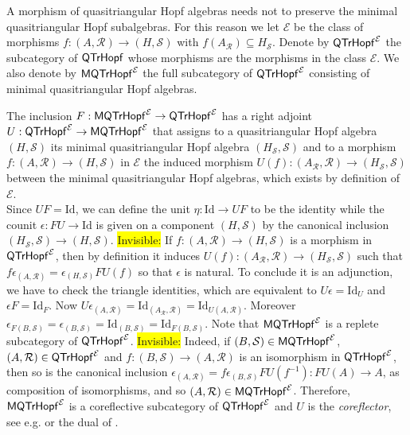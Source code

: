 \documentclass[nosumlimits,twoside]{amsart}
\theoremstyle{definition}
\newtheorem{definition}[definition]{\sc Definition}
\theoremstyle{remark}
\newenvironment{invisible}{{\noindent\sc \colorbox{yellow}{Invisible:}\;}\color{gray}}{\medskip}
\newcommand{\rd}[1]{{\color{red}{#1}}}
\newcommand{\id}{\mathrm{Id}}
\newcommand{\Rr}{\mathcal{R}}
\newcommand{\Ss}{\mathcal{S}}
\def\QTrHopf{{\sf QTrHopf}}
\def\MQTrHopf{{\sf MQTrHopf}}
\begin{document}


A morphism of quasitriangular Hopf algebras needs not to preserve the minimal quasitriangular Hopf subalgebras. For this reason we let $\mathcal{E}$ be the class of morphisms $f:(A,\Rr)\to (H,\Ss)$ with $f(A_\Rr)\subseteq H_{\Ss}$.
Denote by $\QTrHopf^\mathcal{E}
$ the subcategory of $\QTrHopf$ whose morphisms are the morphisms in the class $\mathcal{E}$.
We also denote by $\MQTrHopf^\mathcal{E}$ the full subcategory of $\QTrHopf^\mathcal{E}$ consisting of minimal quasitriangular Hopf algebras.

The inclusion $F:\MQTrHopf^\mathcal{E}\to \QTrHopf^\mathcal{E}$ has a right adjoint
$U:\QTrHopf^\mathcal{E}\to \MQTrHopf^\mathcal{E}$ that assigns to a quasitriangular Hopf algebra $(H,\Ss)$ its minimal quasitriangular Hopf algebra $(H_{\Ss},\Ss)$ and to a morphism $f:(A,\Rr)\to (H,\Ss)$ in $\mathcal{E}$ the induced morphism $U(f):(A_{\Rr},\Rr)\to (H_\Ss,\Ss)$ between the minimal quasitriangular Hopf algebras, which exists by definition of $\mathcal{E}$. \\
Since $UF=\id$, we can define the unit $\eta:\id\to UF$ to be the identity while the counit $\epsilon:FU\to \id$ is given on a component $(H,\Ss)$ by the canonical inclusion $(H_\Ss,\Ss)\to (H,\Ss)$.
\begin{invisible}
If $f:(A,\Rr)\to (H,\Ss)$ is a morphism in $\QTrHopf^\mathcal{E}$, then by definition it induces $U(f):(A_\Rr,\Rr)\to (H_\Ss,\Ss)$ such that $f\epsilon_{(A,\Rr)}=\epsilon_{(H,\Ss)}FU(f)$ so that $\epsilon$ is natural. To conclude it is an adjunction, we have to check the triangle identities, which are equivalent to $U\epsilon=\id_U$ and $\epsilon F=\id_F$. Now $U\epsilon_{(A,\Rr)}=\id_{(A_\Rr,\Rr)}=\id_{U(A,\Rr)}$. Moreover $\epsilon _{F(B,\Ss)}=\epsilon _{(B,\Ss)}=\id_{(B,\Ss)}=\id _{F(B,\Ss)}$.
\end{invisible}
Note that $\MQTrHopf^\mathcal{E}$ is  a replete subcategory of $\QTrHopf^\mathcal{E}$.
\begin{invisible}
Indeed, if $(B,\Ss)\in\MQTrHopf^\mathcal{E}$,  $(A,\Rr)\in \QTrHopf^\mathcal{E}$ and $f:(B,\Ss)\to (A,\Rr)$ is an isomorphism in $\QTrHopf^\mathcal{E}$, then so is the canonical inclusion $\epsilon_{(A,\Rr)}=f\epsilon_{(B,\Ss)}FU(f^{-1}):FU(A)\to A$, as composition of isomorphisms, and so $(A,\Rr)\in \MQTrHopf^\mathcal{E}$.
\end{invisible}
Therefore, $\MQTrHopf^\mathcal{E}$ is a coreflective subcategory of $\QTrHopf^\mathcal{E}$ and $U$ is the \emph{coreflector}, see e.g. \cite[page 91]{Mac98} or the dual of \cite[Definition 3.5.2]{BorI94}.\medskip
\end{document}
